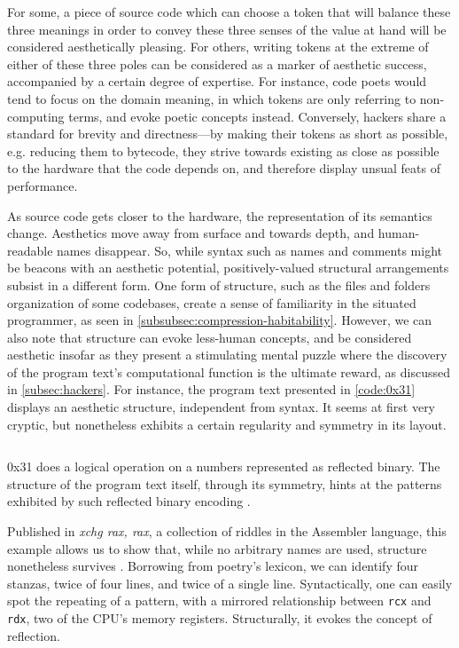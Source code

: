 For some, a piece of source code which can choose a token that will balance these three meanings in order to convey these three senses of the value at hand will be considered aesthetically pleasing. For others, writing tokens at the extreme of either of these three poles can be considered as a marker of aesthetic success, accompanied by a certain degree of expertise. For instance, code poets would tend to focus on the domain meaning, in which tokens are only referring to non-computing terms, and evoke poetic concepts instead. Conversely, hackers share a standard for brevity and directness—by making their tokens as short as possible, e.g. reducing them to bytecode, they strive towards existing as close as possible to the hardware that the code depends on, and therefore display unsual feats of performance.

As source code gets closer to the hardware, the representation of its semantics change. Aesthetics move away from surface and towards depth, and human-readable names disappear. So, while syntax such as names and comments might be beacons with an aesthetic potential, positively-valued structural arrangements subsist in a different form. One form of structure, such as the files and folders organization of some codebases, create a sense of familiarity in the situated programmer, as seen in \ref{subsubsec:compression-habitability}. However, we can also note that structure can evoke less-human concepts, and  be considered aesthetic insofar as they present a stimulating mental puzzle where  the discovery of the program text's computational function is the ultimate reward, as discussed in \ref{subsec:hackers}. For instance, the program text presented in \ref{code:0x31} displays an aesthetic structure, independent from syntax. It seems at first very cryptic, but nonetheless exhibits a certain regularity and symmetry in its layout.

\begin{listing}
    \inputminted{asm}{./corpus/0x31.asm}
    \caption{0x31 does a logical operation on a numbers represented as reflected binary. The structure of the program text itself, through its symmetry, hints at the patterns exhibited by such reflected binary encoding \citep{xorpd_xchg_2014}.}
    \label{code:0x31}
\end{listing}

Published in \emph{xchg rax, rax}, a collection of riddles in the Assembler language, this example allows us to show that, while no arbitrary names are used, structure nonetheless survives \citep{xorpd_xchg_2014}. Borrowing from poetry's lexicon, we can identify four stanzas, twice of four lines, and twice of a single line. Syntactically, one can easily spot the repeating of a pattern, with a mirrored relationship between \lstinline{rcx} and \lstinline{rdx}, two of the CPU's memory registers. Structurally, it evokes the concept of reflection.

